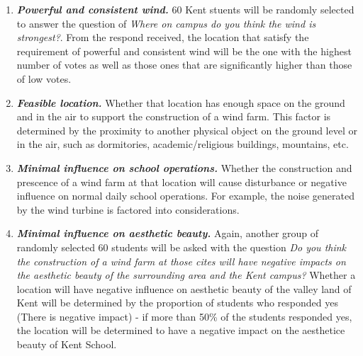 \documentclass[review]{elsarticle}
\begin{document}
\begin{enumerate}[label=\textbf{LDF \arabic*}]
    \item \label{LDF1}\textit{\textbf{Powerful and consistent wind.}} 60 Kent stuents will be randomly selected to answer the question of \textit{Where on campus do you 
    think the wind is strongest?}. From the respond received, the location that satisfy the requirement of powerful and consistent wind will be the 
    one with the highest number of votes as well as those ones that are significantly higher than those of low votes.
    \item \label{LDF2}\textit{\textbf{Feasible location.}} Whether that location has enough space on the ground and in the air to support the construction of a wind 
    farm. This factor is determined by the proximity to another physical object on the ground level or in the air, such as dormitories, 
    academic/religious buildings, mountains, etc.
    \item \label{LDF3}\textit{\textbf{Minimal influence on school operations.}} Whether the construction and prescence of a wind farm at that location will cause 
    disturbance or negative influence on normal daily school operations. For example, the noise generated by the wind turbine is factored 
    into considerations.
    \item \label{LDF4}\textit{\textbf{Minimal influence on aesthetic beauty.}} Again, another group of randomly selected 60 students will be asked with the question 
    \textit{Do you think the construction of a wind farm at those cites will have negative impacts on the aesthetic beauty of the surrounding 
    area and the Kent campus?} Whether a location will have negative influence on aesthetic beauty of the valley land of Kent will be determined 
    by the proportion of students who responded yes (There is negative impact) - if more than 50\% of the students responded yes, the location will 
    be determined to have a negative impact on the aesthetice beauty of Kent School.
\end{enumerate}
\end{document}
